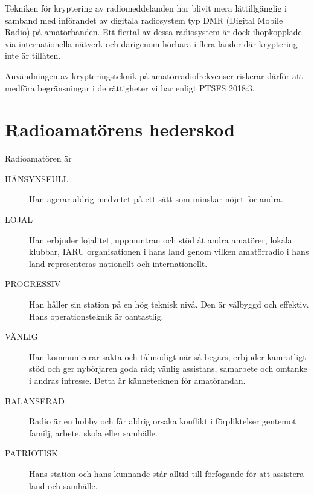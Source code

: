 Tekniken för kryptering av radiomeddelanden har blivit mera lättillgänglig i
samband med införandet av digitala radiosystem typ DMR (Digital Mobile Radio) på
amatörbanden.
Ett flertal av dessa radiosystem är dock ihopkopplade via internationella
nätverk och därigenom hörbara i flera länder där kryptering inte är tillåten.

Användningen av krypteringsteknik på amatörradiofrekvenser riskerar därför att
medföra begränsningar i de rättigheter vi har enligt PTSFS 2018:3.

\newpage %
\section[Hederskod]{Radioamatörens hederskod}

Radioamatören är

\begin{description}
  \item[HÄNSYNSFULL] Han agerar aldrig medvetet på ett sätt som minskar nöjet för andra.

  \item[LOJAL] Han erbjuder lojalitet, uppmuntran och stöd åt andra amatörer, lokala klubbar,
    IARU organisationen i hans land genom vilken amatörradio i hans land
    representeras nationellt och internationellt.

  \item[PROGRESSIV] Han håller sin station på en hög teknisk nivå. Den är välbyggd och effektiv.
    Hans operationsteknik är oantastlig.

  \item[VÄNLIG] Han kommunicerar sakta och tålmodigt när så begärs; erbjuder kamratligt stöd och ger nybörjaren goda råd; vänlig assistans, samarbete och omtanke i andras intresse. Detta är kännetecknen för amatörandan.

  \item[BALANSERAD] Radio är en hobby och får aldrig orsaka konflikt i förpliktelser gentemot
    familj, arbete, skola eller samhälle.

  \item[PATRIOTISK] Hans station och hans kunnande står alltid till förfogande för att
    assistera land och samhälle.
\end{description}

  
